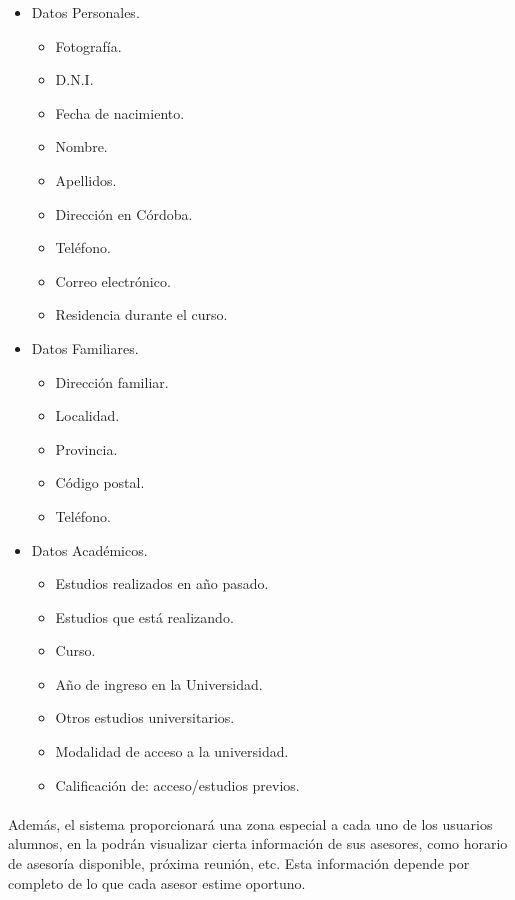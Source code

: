       \begin{itemize}
         \item Datos Personales.
         \begin{itemize}
            \item Fotografía.
            \item D.N.I.
            \item Fecha de nacimiento.
            \item Nombre.
            \item Apellidos.
            \item Dirección en Córdoba.
            \item Teléfono.
            \item Correo electrónico.
            \item Residencia durante el curso.
         \end{itemize}
         \item Datos Familiares.
         \begin{itemize}
            \item Dirección familiar.
            \item Localidad.
            \item Provincia.
            \item Código postal.
            \item Teléfono.
         \end{itemize}
         \item Datos Académicos.
         \begin{itemize}
            \item Estudios realizados en año pasado.
            \item Estudios que está realizando.
            \item Curso.
            \item Año de ingreso en la Universidad.
            \item Otros estudios universitarios.
            \item Modalidad de acceso a la universidad.
            \item Calificación de: acceso/estudios previos.
         \end{itemize}
      \end{itemize}

      \paragraph{}Además, el sistema proporcionará una zona especial
      a cada uno de los usuarios alumnos, en la podrán visualizar cierta
      información de sus asesores, como horario de asesoría disponible, próxima
      reunión, etc. Esta información depende por completo de lo que cada asesor
      estime oportuno.

